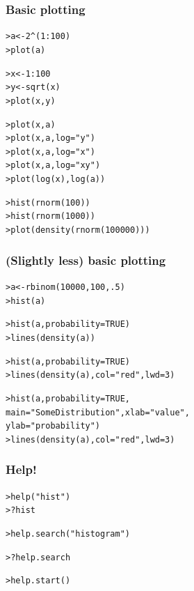 \documentclass[t]{beamer} %
\begin{document}
\begin{frame}[fragile]
  \frametitle{Basic plotting}

  \ungap[1.5]
\begin{alltt}
> a <- 2^(1:100)        
> plot(a)

> x <- 1:100            
> y <- sqrt(x)
> plot(x, y)

> plot(x, a)
> plot(x, a, log="y")   
> plot(x, a, log="x")
> plot(x, a, log="xy")
> plot(log(x), log(a))

> hist(rnorm(100))      
> hist(rnorm(1000))
> plot(density(rnorm(100000)))
\end{alltt}

\end{frame}

\begin{frame}[fragile]
  \frametitle{(Slightly less) basic plotting}

  \ungap[1]
\begin{alltt}
> a <- rbinom(10000,100,.5)
> hist(a)

> hist(a, probability=TRUE)
> lines(density(a))

> hist(a, probability=TRUE)
> lines(density(a), col="red", lwd=3)

> hist(a, probability=TRUE, 
  main="Some Distribution", xlab="value",
  ylab="probability")  
> lines(density(a), col="red", lwd=3)
\end{alltt}

\end{frame}

\begin{frame}[fragile]
  \frametitle{Help!}

\begin{alltt}
> help("hist")  
> ?hist          

> help.search("histogram")

> ?help.search

> help.start()  

\end{alltt}

\end{frame}
\end{document}
